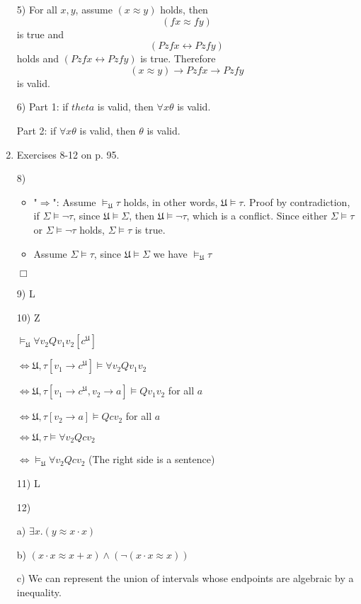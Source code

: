 \documentclass[12pt]{article}
\begin{document}
\begin{enumerate}
		
		5) For all $x,y$, assume $(x\approx y)$ holds, then 
		$$(fx\approx fy)$$ is true and 
		$$(Pzfx\leftrightarrow Pzfy)$$ holds and $(Pzfx\leftrightarrow Pzfy)$ is true. Therefore $$(x\approx y)\to Pzfx\to Pzfy$$ is valid.
		
		
		6) Part 1: if $theta$ is valid, then $\forall x\theta$ is valid.\newline
		
		Part 2: if $\forall x\theta$ is valid, then $\theta$ is valid.\newline
		
		
		\item
		Exercises 8-12 on p. 95.
		
		8) 
		\begin{itemize}
			\item "$\Rightarrow$": Assume $\models_{\mathfrak{U}}\tau$ holds, in other words, $\mathfrak{U}\models \tau$. Proof by contradiction, if $\Sigma\models \neg\tau$, since $\mathfrak{U}\models\Sigma$, then $\mathfrak{U}\models \neg\tau$, which is a conflict. Since either $\Sigma\models\tau$ or $\Sigma\models\neg\tau$ holds, $\Sigma\models\tau$ is true.
			\item Assume $\Sigma\models\tau$, since $\mathfrak{U}\models \Sigma$ we have $\models_{\mathfrak{U}}\tau$
		\end{itemize}
		$\Box$
		
		9) L
		
		10) Z
		
		$\models_{\mathfrak{U}}\forall v_2 Qv_1 v_2[c^{\mathfrak{U}}]$
		
		$\Leftrightarrow \mathfrak{U},\tau[v_1\to c^{\mathfrak{U}}]\models\forall v_2 Qv_1 v_2$
		
		$\Leftrightarrow \mathfrak{U},\tau[v_1\to c^{\mathfrak{U}},v_2\to a]\models Q v_1 v_2$ for all $a$
		
		$\Leftrightarrow \mathfrak{U},\tau[v_2\to a]\models Qcv_2$ for all $a$
		
		$\Leftrightarrow \mathfrak{U},\tau\models \forall v_2 Qcv_2$ 
		
		$\Leftrightarrow \models_{\mathfrak{U}} \forall v_2 Qcv_2$ (The right side is a sentence)
		
		 
		11) L
		
		12) 
		
		a) $\exists x.(y\approx x\cdot x)$
		
		b) $(x\cdot x\approx x+x) \wedge (\neg( x\cdot x\approx x)) $
		
		c) 
		We can represent the union of intervals whose endpoints are algebraic by a inequality.
		

\end{enumerate}
\end{document}
